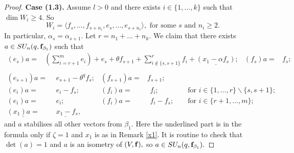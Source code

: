 \begin{proof}

\medskip

{\bf Case (1.3).} Assume $l >0$ and there exists $i \in \{1, \ldots, k\}$ such that $\dim W_i \ge 4$. So 
 $$W_i = \langle f_s, \ldots, f_{s+n_i}, e_{s}, \ldots, e_{s+n_i}\rangle,  \text{ for some } s \text{ and } n_i \ge 2.$$
In particular, $\alpha_s=\alpha_{s+1}.$ Let $r= n_1 + \ldots + n_k.$ 
We claim that there exists  $a \in SU_n(q, {\bf f}_{\beta_1})$ such that 
\begin{align*}
(e_s)a= & (\sum_{i=r+1}^m e_i)+ e_s + \theta f_{s+1} + \sum_{i \notin \{s,s+1\}}^r f_i + \underline{(x_1-\alpha f_s)}; & (f_s)a= & f_s; & \\
\end{align*}
\begin{align*}
(e_{s+1})a=  & \phantom{(}  e_{s+1} -\theta^q f_s; & (f_{s+1})a= & f_{s+1}; & \\
(e_i)a= & \phantom{(} e_i-f_s; & (f_i)a= & \phantom{(} f_i; & & \text{ for } i \in \{1, \ldots, r\} \backslash \{s, s+1\}; \\
(e_i)a= & \phantom{(} e_i; & (f_i)a= & \phantom{(} f_i -f_s; & & \text{ for } i \in \{r+1, \ldots, m\};\\
\underline{(x_1)a=} & \underline{\phantom{(} x_1-f_s}, & & & 
\end{align*}
and $a$ stabilises all other vectors from $\beta_1.$ Here the underlined part is in the formula only if ${\zeta}=1$ and $x_1$ is as in Remark \ref{x1}. %
  It is routine to check that $\det(a)=1$ and $a$ is an isometry of $(V, {\bf f}),$ so $a \in SU_n(q,{\bf f}_{\beta_1}).$


\end{proof}
